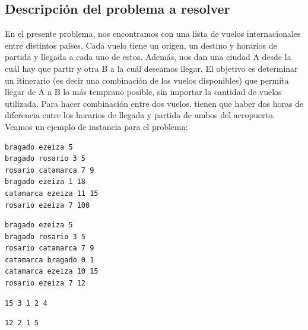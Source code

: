 \documentclass[11pt, a4paper, twoside]{article}
\begin{document}
\subsection{Descripción del problema a resolver}
En el presente problema, nos encontramos con una lista de vuelos internacionales
entre distintos países. Cada vuelo tiene un origen, un destino y horarios de 
partida y llegada a cada uno de estos. Además, nos dan una ciudad A desde
la cuál hay que partir y otra B a la cuál deseamos llegar. El objetivo es determinar un 
itinerario (es decir una combinación de los vuelos disponibles) que permita llegar 
de A a B lo más temprano posible, sin importar la cantidad de vuelos utilizada. Para
hacer combinación entre dos vuelos, tienen que haber dos horas de diferencia entre los
horarios de llegada y partida de ambos del aeropuerto. Veamos un ejemplo de instancia 
para el problema: \\

\begin{minipage}[t]{0.4\textwidth}
\begin{Verbatim}[frame=single,framesep=1cm,label= Ejemplo de instancia 1]
bragado ezeiza 5
bragado rosario 3 5
rosario catamarca 7 9
bragado ezeiza 1 18
catamarca ezeiza 11 15
rosario ezeiza 7 100
\end{Verbatim}
\end{minipage}
\hfill
\begin{minipage}[t]{0.4\textwidth}
\begin{Verbatim}[frame=single,framesep=1cm,label= Ejemplo de instancia 2]
bragado ezeiza 5
bragado rosario 3 5
rosario catamarca 7 9
catamarca bragado 0 1
catamarca ezeiza 10 15
rosario ezeiza 7 12
\end{Verbatim}
\end{minipage}

\begin{minipage}[t]{0.4\textwidth}
\begin{Verbatim}[frame=single,framesep=1cm,label= Salida para instancia 1]
15 3 1 2 4
\end{Verbatim}
\end{minipage}
\hfill
\begin{minipage}[t]{0.4\textwidth}
\begin{Verbatim}[frame=single,framesep=1cm,label= Salida para instancia 2]
12 2 1 5
\end{Verbatim}
\end{minipage}
\end{document}
